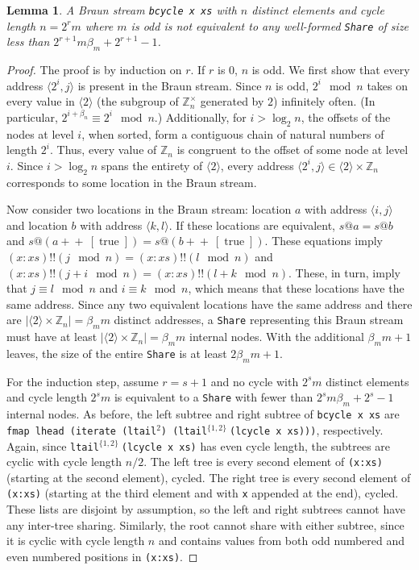 \documentclass[envcountsect]{llncs}
\DeclareMathOperator{\true}{true}
\newcommand{\app}{+\!\!\!+\ }
\newcommand{\share}{{\tt Share} }
\newtheorem{lemma}[theorem]{Lemma}
\begin{document}
\begin{lemma}
\label{cycleSizeMin}
A Braun stream {\tt bcycle x xs} with $n$ distinct elements and cycle length $n = 2^r m$ where $m$ is odd is not equivalent to any well-formed \share of size less than $2^{r+1} m \beta_m + 2^{r+1} - 1$.
\end{lemma}
\begin{proof}

The proof is by induction on $r$.
If $r$ is $0$, $n$ is odd.
We first show that every address $\langle 2^i,j \rangle$ is present in the Braun stream.
Since $n$ is odd, $2^i \mod n$ takes on every value in $\langle 2 \rangle$ (the subgroup of $\mathbb{Z}_n^{\times}$ generated by $2$) infinitely often.
(In particular, $2^{i+\beta_n} \equiv 2^i \mod n$.)
Additionally, for $i > \log_2 n$, the offsets of the nodes at level $i$, when sorted, form a contiguous chain of natural numbers of length $2^i$.
Thus, every value of $\mathbb{Z}_n$ is congruent to the offset of some node at level $i$.
Since $i > \log_2 n$ spans the entirety of $\langle 2 \rangle$, every address $\langle 2^i,j \rangle \in \langle 2 \rangle \times \mathbb{Z}_n$ corresponds to some location in the Braun stream.

Now consider two locations in the Braun stream: location $a$ with address $\langle i,j \rangle$ and location $b$ with address $\langle k,l \rangle$.
If these locations are equivalent, $s@a = s@b$ and $s@(a \app [\true]) = s@(b \app [\true])$.
These equations imply $(x:xs) !! (j\mod n) = (x:xs) !! (l\mod n)$ and $(x:xs) !! (j+i\mod n) = (x:xs) !! (l+k\mod n)$.
These, in turn, imply that $j \equiv l \mod n$ and $i \equiv k \mod n$, which means that these locations have the same address.
Since any two equivalent locations have the same address and there are $|\langle 2 \rangle \times \mathbb{Z}_n| = \beta_m m$ distinct addresses, a \share representing this Braun stream must have at least $|\langle 2 \rangle \times \mathbb{Z}_n| = \beta_m m$ internal nodes.
With the additional $\beta_m m + 1$ leaves, the size of the entire \share is at least $2 \beta_m m + 1$.

For the induction step, assume $r = s+1$ and no cycle with $2^s m$ distinct elements and cycle length $2^s m$ is equivalent to a \share with fewer than $2^s m \beta_m + 2^s - 1$ internal nodes.
As before, the left subtree and right subtree of {\tt bcycle x xs} are {\tt fmap lhead (iterate (ltail}$^2${\tt ) (ltail}$^{\{1,2\}}\ ${\tt (lcycle x xs)))}, respectively.
Again, since {\tt ltail}$^{\{1,2\}}\ ${\tt (lcycle x xs)} has even cycle length, the subtrees are cyclic with cycle length $n/2$.
The left tree is every second element of {\tt (x:xs)} (starting at the second element), cycled.
The right tree is every second element of {\tt (x:xs)} (starting at the third element and with {\tt x} appended at the end), cycled.
These lists are disjoint by assumption, so the left and right subtrees cannot have any inter-tree sharing.
Similarly, the root cannot share with either subtree, since it is cyclic with cycle length $n$ and contains values from both odd numbered and even numbered positions in {\tt (x:xs)}.


\end{proof}
\end{document}
